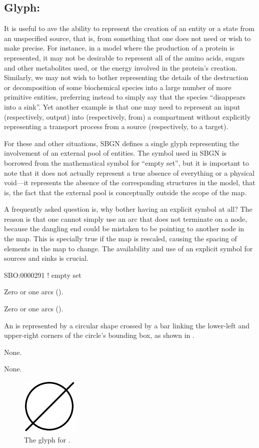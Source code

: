 \subsection{Glyph: }
\label{sec:emptySet}

It is useful to ave the ability to represent the creation of an entity or a state from an unspecified source, that is, from something that one does not need or wish to make precise.  For instance, in a model where the production of a protein is represented, it may not be desirable to represent all of the amino acids, sugars and other metabolites used, or the energy involved in the protein's creation.
Similarly, we may not wish to bother representing the details of the destruction or decomposition of some biochemical species into a large number of more primitive entities, preferring instead to simply say that the species ``disappears into a sink''.
Yet another example is that one may need to represent an input (respectively, output) into (respectively, from) a compartment without explicitly representing a transport process from a source (respectively, to a target).

For these and other situations, SBGN defines a single glyph representing the involvement of an external pool of entities.
The symbol used in SBGN is borrowed from the mathematical symbol for ``empty set'', but it is important to note that it does not actually represent a true absence of everything or a physical void---it represents the absence of the corresponding structures in the model, that is, the fact that the external pool is conceptually outside the scope of the map.

A frequently asked question is, why bother having an explicit symbol at all?
The reason is that one cannot simply use an arc that does not terminate on a node, because the dangling end could be mistaken to be pointing to another node in the map.  This is specially true if the map is rescaled, causing the spacing of elements in the map to change.
The availability and use of an explicit symbol for sources and sinks is crucial.

\begin{glyphDescription}

\glyphSboTerm
SBO:0000291 ! empty set

\glyphIncoming
Zero or one  arcs ().

\glyphOutgoing
Zero or one  arcs ().

\glyphContainer
An  is represented by a circular shape crossed by a bar linking the lower-left and upper-right corners of the circle's bounding box, as shown in .

\glyphLabel
None.

\glyphAux
None.

\end{glyphDescription}

\begin{figure}[H]
  \centering
  \includegraphics{images/build/empty_set.pdf}
  \caption{The \PD glyph for .}
  \label{fig:emptySet}
\end{figure}
